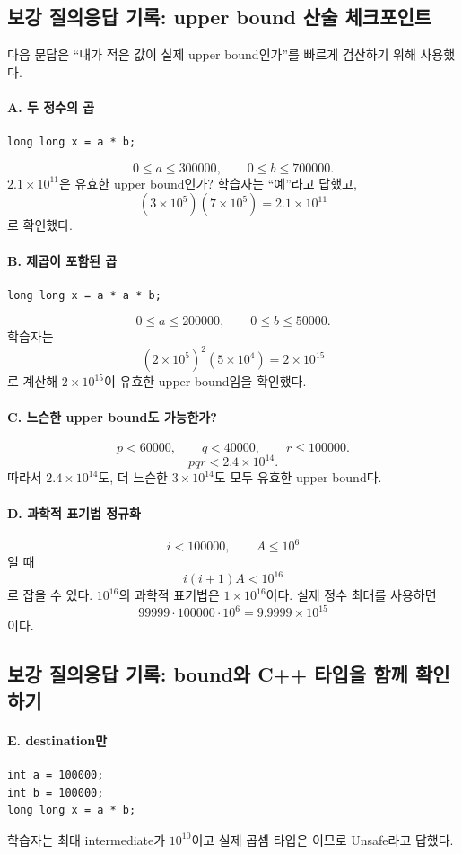 \subsection{보강 질의응답 기록: upper bound 산술 체크포인트}
다음 문답은 ``내가 적은 값이 실제 upper bound인가''를 빠르게 검산하기 위해 사용했다.

\paragraph{A. 두 정수의 곱}
\begin{lstlisting}
long long x = a * b;
\end{lstlisting}
\[
0\le a\le300000,\qquad0\le b\le700000.
\]
$2.1\times10^{11}$은 유효한 upper bound인가? 학습자는 ``예''라고 답했고,
\[
(3\times10^5)(7\times10^5)=2.1\times10^{11}
\]
로 확인했다.

\paragraph{B. 제곱이 포함된 곱}
\begin{lstlisting}
long long x = a * a * b;
\end{lstlisting}
\[
0\le a\le200000,\qquad0\le b\le50000.
\]
학습자는
\[
(2\times10^5)^2(5\times10^4)=2\times10^{15}
\]
로 계산해 $2\times10^{15}$이 유효한 upper bound임을 확인했다.

\paragraph{C. 느슨한 upper bound도 가능한가?}
\[
p<60000,\qquad q<40000,\qquad r\le100000.
\]
\[
pqr<2.4\times10^{14}.
\]
따라서 $2.4\times10^{14}$도, 더 느슨한 $3\times10^{14}$도 모두 유효한 upper bound다.

\paragraph{D. 과학적 표기법 정규화}
\[
i<100000,\qquad A\le10^6
\]
일 때
\[
i(i+1)A<10^{16}
\]
로 잡을 수 있다. $10^{16}$의 과학적 표기법은 $1\times10^{16}$이다. 실제 정수 최대를 사용하면
\[
99999\cdot100000\cdot10^6=9.9999\times10^{15}
\]
이다.

\subsection{보강 질의응답 기록: bound와 C++ 타입을 함께 확인하기}
\paragraph{E. destination만 }
\begin{lstlisting}
int a = 100000;
int b = 100000;
long long x = a * b;
\end{lstlisting}
학습자는 최대 intermediate가 $10^{10}$이고 실제 곱셈 타입은 이므로 Unsafe라고 답했다.

